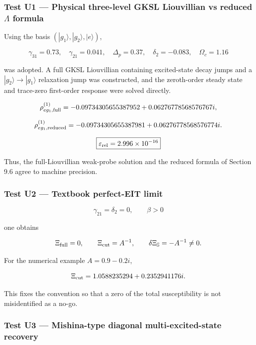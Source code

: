 \documentclass[
  10pt,
  a4paper,
]{article}
\begin{document}
\subsubsection{\texorpdfstring{Test U1 --- Physical three-level GKSL
Liouvillian vs reduced \(\Lambda\)
formula}{Test U1 --- Physical three-level GKSL Liouvillian vs reduced \textbackslash Lambda formula}}\label{test-u1-physical-three-level-gksl-liouvillian-vs-reduced-lambda-formula}

Using the basis \((|g_1\rangle,|g_2\rangle,|e\rangle)\),

\[
\gamma_{31}=0.73,
\quad
\gamma_{21}=0.041,
\quad
\Delta_p=0.37,
\quad
\delta_2=-0.083,
\quad
\Omega_c=1.16
\]

was adopted. A full GKSL Liouvillian containing excited-state decay
jumps and a \(|g_2\rangle\to|g_1\rangle\) relaxation jump was
constructed, and the zeroth-order steady state and trace-zero
first-order response were solved directly.

\[
\rho_{eg_1,\rm full}^{(1)}
=-0.09734305655387952
+0.06276778568576767i,
\]

\[
\rho_{eg_1,\rm reduced}^{(1)}
=-0.09734305655387981
+0.06276778568576774i.
\]

\[
\boxed{
\varepsilon_{\rm rel}=2.996\times10^{-16}
}
\]

Thus, the full-Liouvillian weak-probe solution and the reduced formula
of Section 9.6 agree to machine precision.

\subsubsection{Test U2 --- Textbook perfect-EIT
limit}\label{test-u2-textbook-perfect-eit-limit}

\[
\gamma_{21}=\delta_2=0,
\qquad
\beta>0
\]

one obtains

\[
\Xi_{\rm full}=0,
\qquad
\Xi_{\rm cut}=A^{-1},
\qquad
\delta\Xi_{\mathbb S}=-A^{-1}\neq0.
\]

For the numerical example \(A=0.9-0.2i\),

\[
\Xi_{\rm cut}=1.0588235294+0.2352941176i.
\]

This fixes the convention so that a zero of the total susceptibility is
not misidentified as a no-go.

\subsubsection{Test U3 --- Mishina-type diagonal multi-excited-state
recovery}\label{test-u3-mishina-type-diagonal-multi-excited-state-recovery}
\end{document}
